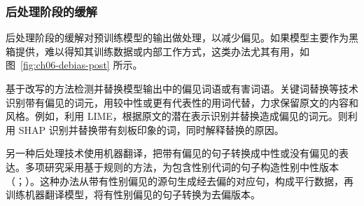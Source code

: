 \subsubsection{后处理阶段的缓解}
后处理阶段的缓解对预训练模型的输出做处理，以减少偏见。如果模型主要作为黑箱提供，难以得知其训练数据或内部工作方式，这类办法尤其有用，如图~\ref{fig:ch06-debias-post} 所示。


\begin{practicaltip}
基于改写的方法检测并替换模型输出中的偏见词语或有害词语。关键词替换等技术识别带有偏见的词元，用较中性或更有代表性的用词代替，力求保留原文的内容和风格。例如，利用 LIME，根据原文的潜在表示识别并替换造成偏见的词元。则利用 SHAP 识别并替换带有刻板印象的词，同时解释替换的原因。
\end{practicaltip}

另一种后处理技术使用机器翻译，把带有偏见的句子转换成中性或没有偏见的表达。多项研究采用基于规则的方法，为包含性别代词的句子构造性别中性版本（；）。这种办法从带有性别偏见的源句生成经去偏的对应句，构成平行数据，再训练机器翻译模型，将有性别偏见的句子转换为去偏版本。
